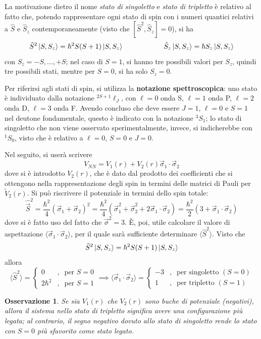 \documentclass[11pt, a4paper]{scrartcl}
\theoremstyle{style}
\newtheorem{osservazione}{Osservazione}[section]
\newenvironment{boxenv}[1][]{
    \begin{eqbox}[#1]
    }{
   \end{eqbox}
}
\numberwithin{equation}{subsection}
\begin{document}
\begin{boxenv}[]
La motivazione dietro il nome \textit{stato di singoletto} e \textit{stato di tripletto} \`e relativo al fatto che, potendo rappresentare ogni stato di spin con i numeri quantici relativi a $\hat{S}$ e $\hat{S}_z$ contemporaneamente (visto che $[ \hat{S}^2,\hat{S}_z ]  = 0$), si ha
\[
\hat{S}^2 \ket{S,S_z}  = \hbar ^2 S (S+1)\ket{S,S_z}  \hspace{2cm} \hat{S}_z \ket{S,S_z}  = \hbar S_z \ket{S,S_z} 
\] 
con $S_z = -S,\ldots,+S$; nel caso di $S=1$, si hanno tre possibili valori per $S_z$, quindi tre possibili stati, mentre per $S=0$, si ha solo $S_z=0$.

Per riferirsi agli stati di spin, si utilizza la \textbf{notazione spettroscopica}: uno stato \`e individuato dalla notazione $^{2S+1}\ell _J$, con $\ell =0$ onda S, $\ell =1$ onda P, $\ell =2$ onda D, $\ell =3$ onda F.
Avendo concluso che deve essere $J=1$, $\ell =0$ e $S=1$ nel deutone fondamentale, questo \`e indicato con la notazione $^{3}S_1$; lo stato di singoletto che non viene osservato sperimentalmente, invece, si indicherebbe con $^{1}S_0$, visto che \`e relativo a $\ell =0$, $S=0$ e $J=0$.
\end{boxenv}

\noindent Nel seguito, si user\`a scrivere 
\[
V_{N N} = V_1(r) + V_2(r) \vec{\sigma }_1 \cdot \vec{\sigma }_2
\] 
dove si \`e introdotto $V_2(r)$, che \`e dato dal prodotto dei coefficienti che si ottengono nella rappresentazione degli spin in termini delle matrici di Pauli per $\tilde{V}_2(r)$.
Si pu\`o riscrivere il potenziale in termini dello spin totale:
\[
\hat{\vec{S}}^2 = \frac{\hbar^2}{4} \left(\vec{\sigma }_1 + \vec{\sigma }_2\right) ^2 = \frac{\hbar ^2}{4}\left(\vec{\sigma }_1^2 + \vec{\sigma }_2 ^2 + 2 \vec{\sigma }_1 \cdot \vec{\sigma }_2\right)  = \frac{\hbar ^2}{2} \left(3 + \vec{\sigma }_1 \cdot \vec{\sigma }_2\right) 
\] 
dove si \`e fatto uso del fatto che $\vec{\sigma }^2 = 3$.
\`E, poi, utile calcolare il valore di aspettazione $\langle \vec{\sigma }_1 \cdot \vec{\sigma }_2 \rangle$, per il quale sar\`a sufficiente determinare $\langle \hat{S}^2 \rangle$.
Visto che
\[
\hat{S}^2 \ket{S,S_z} = \hbar ^2 S(S+1) \ket{S,S_z} 
\] 
allora
\[
\langle \hat{S}^2 \rangle = \begin{cases}
	0 &,\ \text{ per }S=0\\
	2\hbar ^2 &,\ \text{ per } S=1 
\end{cases} \implies \langle \vec{\sigma }_1 \cdot \vec{\sigma }_2 \rangle = \begin{cases}
	-3 &,\ \text{ per singoletto } (S=0)\\
	1 &,\ \text{ per tripletto } (S=1)
\end{cases}
\] 
\begin{osservazione}
Se sia $V_1(r)$ che $V_2(r)$ sono buche di potenziale (negativi), allora il sistema nello stato di tripletto significa avere una configurazione pi\`u legata; al contrario, il segno negativo dovuto allo stato di singoletto rende lo stato con $S=0$ pi\`u sfavorito come stato legato. 
\end{osservazione}
\end{document}
